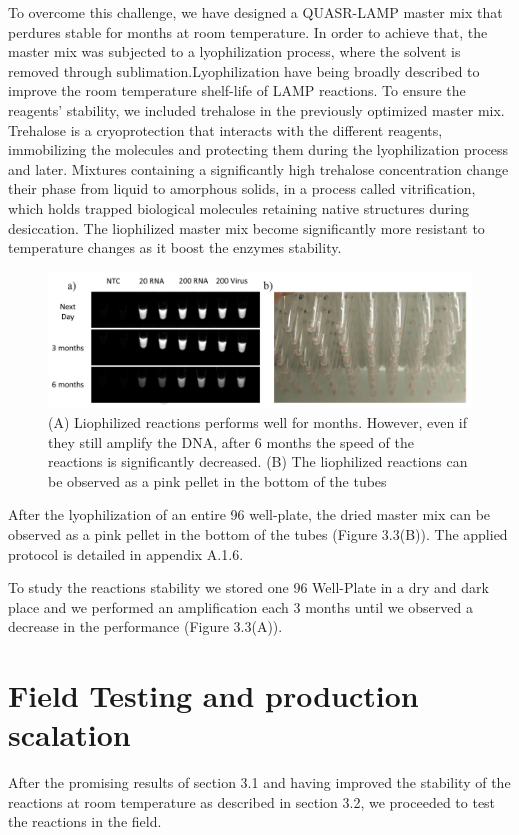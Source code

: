 To overcome this challenge, we have designed a QUASR-LAMP master mix that perdures stable for months at room temperature. In order to achieve that, the master mix was subjected to a lyophilization process, where the solvent is removed through sublimation.Lyophilization have being broadly described to improve the room temperature shelf-life of LAMP reactions\cite{hayashida_direct_2015}\cite{garcia-bernalt_diego_progress_2019}. To ensure the reagents' stability, we included trehalose in the previously optimized master mix. Trehalose is a cryoprotection that interacts with the different reagents, immobilizing the molecules and protecting them during the lyophilization process and later. Mixtures containing a significantly high trehalose concentration change their phase from liquid to amorphous solids, in a process called vitrification, which holds trapped biological molecules retaining native structures during desiccation\cite{hayashida_direct_2015}. The liophilized master mix become significantly more resistant to temperature changes as it boost the enzymes stability.
 
 \begin{figure}[hb]
    \centering
    \includegraphics[width=1\textwidth]{figures/liophilization.jpg}
    \caption{ (A) Liophilized reactions performs well for months. However, even if they still amplify the DNA, after 6 months the speed of the reactions is significantly decreased. (B) The liophilized reactions can be observed as a pink pellet in the bottom of the tubes}
    \label{liophilization}
\end{figure}

After the lyophilization of an entire 96 well-plate, the dried master mix can be observed as a pink pellet in the bottom of the tubes (Figure 3.3(B)). The applied protocol is detailed in appendix A.1.6. 

To study the reactions stability we stored one 96 Well-Plate in a dry and dark place and we performed an amplification each 3 months until we observed a decrease in the performance (Figure 3.3(A)).

\section{Field Testing and production scalation} %
After the promising results of section 3.1 and having improved the stability of the reactions at room temperature as described in section 3.2, we proceeded to test the reactions in the field.

